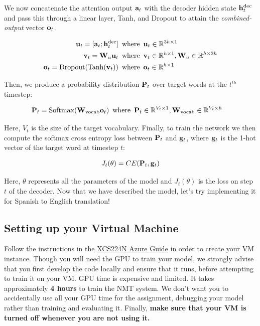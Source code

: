 We now concatenate the attention output $\mathbf{a}_t$ with the decoder hidden state $\mathbf{h}^{\text{dec}}_t$ and pass this through a linear layer, Tanh, and Dropout to attain the \textit{combined-output} vector $\mathbf{o}_{t}$.

\begin{align}   
    \mathbf{u}_{t} = [\mathbf{a}_{t}; \mathbf{h}^{\text{dec}}_t ] \enspace &\text{where} \enspace \mathbf{u}_t \in \mathbb{R}^{3h \times 1} \\
    \mathbf{v}_t = \mathbf{W}_{u}\mathbf{u}_t \enspace &\text{where} \enspace \mathbf{v}_t \in \mathbb{R}^{h \times 1}, \mathbf{W}_{u} \in \mathbb{R}^{h \times 3h}\\
    \mathbf{o}_t = \text{Dropout}(\text{Tanh}(\mathbf{v}_t)) \enspace &\text{where} \enspace \mathbf{o}_t \in \mathbb{R}^{h \times 1}
\end{align}

Then, we produce a probability distribution $\mathbf{P}_t$ over target words at the $t^{th}$ timestep:

\begin{align}
    \mathbf{P}_t = \text{Softmax}(\mathbf{W}_{\text{vocab}}\mathbf{o}_{t}) \enspace &\text{where} \enspace \mathbf{P}_t \in \mathbb{R}^{V_{t} \times 1}, \mathbf{W}_{\text{vocab}} \in \mathbb{R}^{V_{t} \times h}
\end{align}

Here, $V_{t}$ is the size of the target vocabulary. Finally, to train the network we then compute the softmax cross entropy loss between $\mathbf{P}_t$ and $\mathbf{g}_{t}$, where $\mathbf{g}_{t}$ is the 1-hot vector of the target word at timestep $t$:

\begin{align}
    J_t(\theta) = CE(\mathbf{P}_t,\mathbf{g}_{t})
\end{align}

Here, $\theta$ represents all the parameters of the model and $J_t(\theta)$ is the loss on step $t$ of the decoder.
Now that we have described the model, let's try implementing it for Spanish to English translation!

\subsection*{{\color{red} Setting up your Virtual Machine}}
Follow the instructions in the \href{https://docs.google.com/document/d/1oy4FLADpCQDYYnO37ryntPV42foOgwtycbP5PMC8a8w}{XCS224N Azure Guide} in order to create your VM instance. Though you will need the GPU to train your model, we strongly advise that you first develop the code locally and ensure that it runs, before attempting to train it on your VM. GPU time is expensive and limited. It takes approximately \textbf{4 hours} to train the NMT system. We don't want you to accidentally use all your GPU time for the assignment, debugging your model rather than training and evaluating it. Finally, \textbf{make sure that your VM is turned off whenever you are not using it.}


